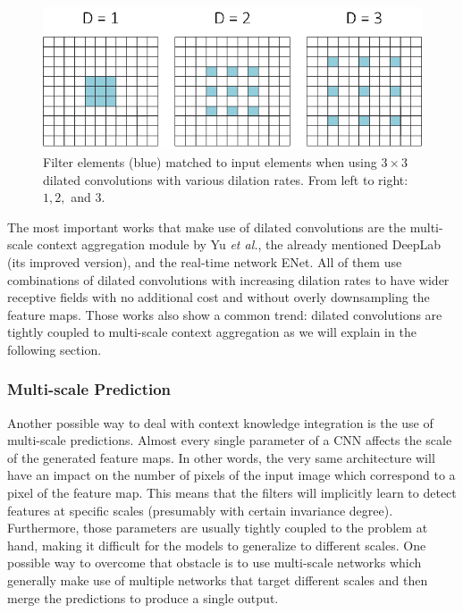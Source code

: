 \begin{figure}[!hbt]
	\centering
	\includegraphics[width=\linewidth]{Figures/Segmentation/dilatedconvolutions_rework.eps}
	\caption{Filter elements (blue) matched to input elements when using $3\times3$ dilated convolutions with various dilation rates. From left to right: $1, 2, $ and $3$.}
	\label{fig:semseg:dilated-convolution-filter}
\end{figure}

The most important works that make use of dilated convolutions are the multi-scale context aggregation module by Yu \emph{et al.}\cite{Yu2015}, the already mentioned DeepLab (its improved version)\cite{Chen2016}, and the real-time network ENet\cite{Paszke2016}. All of them use combinations of dilated convolutions with increasing dilation rates to have wider receptive fields with no additional cost and without overly downsampling the feature maps. Those works also show a common trend: dilated convolutions are tightly coupled to multi-scale context aggregation as we will explain in the following section.

\subsubsection{Multi-scale Prediction}

Another possible way to deal with context knowledge integration is the use of multi-scale predictions. Almost every single parameter of a \acs{CNN} affects the scale of the generated feature maps. In other words, the very same architecture will have an impact on the number of pixels of the input image which correspond to a pixel of the feature map. This means that the filters will implicitly learn to detect features at specific scales (presumably with certain invariance degree). Furthermore, those parameters are usually tightly coupled to the problem at hand, making it difficult for the models to generalize to different scales. One possible way to overcome that obstacle is to use multi-scale networks which generally make use of multiple networks that target different scales and then merge the predictions to produce a single output.

